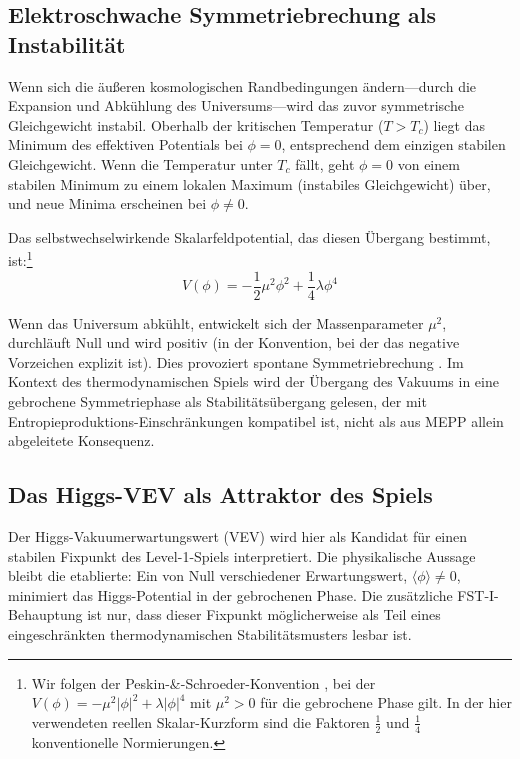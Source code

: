 \documentclass[12pt,a4paper]{article}
\theoremstyle{remark}
\begin{document}
\subsection{Elektroschwache Symmetriebrechung als Instabilit\"at}

Wenn sich die \"au\ss{}eren kosmologischen Randbedingungen \"andern---durch die Expansion und Abk\"uhlung des Universums---wird das zuvor symmetrische Gleichgewicht instabil. Oberhalb der kritischen Temperatur ($T > T_c$) liegt das Minimum des effektiven Potentials bei $\phi = 0$, entsprechend dem einzigen stabilen Gleichgewicht. Wenn die Temperatur unter $T_c$ f\"allt, geht $\phi = 0$ von einem stabilen Minimum zu einem lokalen Maximum (instabiles Gleichgewicht) \"uber, und neue Minima erscheinen bei $\phi \neq 0$.

Das selbstwechselwirkende Skalarfeldpotential, das diesen \"Ubergang bestimmt, ist:\footnote{Wir folgen der Peskin-\&-Schroeder-Konvention \citep{HiggsVEV}, bei der $V(\phi) = -\mu^2 |\phi|^2 + \lambda |\phi|^4$ mit $\mu^2 > 0$ f\"ur die gebrochene Phase gilt. In der hier verwendeten reellen Skalar-Kurzform sind die Faktoren $\frac{1}{2}$ und $\frac{1}{4}$ konventionelle Normierungen.}
\begin{equation}
V(\phi) = -\frac{1}{2}\mu^2 \phi^2 + \frac{1}{4}\lambda \phi^4
\end{equation}

Wenn das Universum abk\"uhlt, entwickelt sich der Massenparameter $\mu^2$, durchl\"auft Null und wird positiv (in der Konvention, bei der das negative Vorzeichen explizit ist). Dies provoziert spontane Symmetriebrechung \citep{HiggsVEV2024}. Im Kontext des thermodynamischen Spiels wird der \"Ubergang des Vakuums in eine gebrochene Symmetriephase als Stabilit\"ats\"ubergang gelesen, der mit Entropieproduktions-Einschr\"ankungen kompatibel ist, nicht als aus MEPP allein abgeleitete Konsequenz.

\subsection{Das Higgs-VEV als Attraktor des Spiels}

Der Higgs-Vakuumerwartungswert (VEV) wird hier als Kandidat f\"ur einen stabilen Fixpunkt des Level-1-Spiels interpretiert. Die physikalische Aussage bleibt die etablierte: Ein von Null verschiedener Erwartungswert, $\langle\phi\rangle \neq 0$, minimiert das Higgs-Potential in der gebrochenen Phase. Die zus\"atzliche FST-I-Behauptung ist nur, dass dieser Fixpunkt m\"oglicherweise als Teil eines eingeschr\"ankten thermodynamischen Stabilit\"atsmusters lesbar ist.
\end{document}
